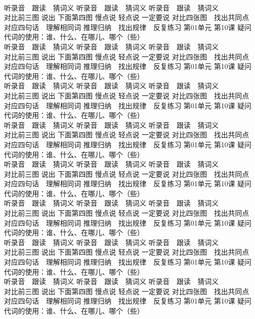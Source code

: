 \documentclass[8pt]{extreport}
\begin{document}
\begin{CJK}{UTF8}{min}
\\	听录音　跟读　猜词义 听录音　跟读　猜词义 听录音　跟读　猜词义 
\\	对比前三图 说出 下面第四图 慢点说 轻点说 一定要说	对比四张图　找出共同点 对应四句话　理解相同词 推理归纳　找出规律　反复练习 第01单元 第10课 疑问代词的使用：谁、什么、在哪儿、哪个（些）
\\	听录音　跟读　猜词义 听录音　跟读　猜词义 听录音　跟读　猜词义 
\\	对比前三图 说出 下面第四图 慢点说 轻点说 一定要说	对比四张图　找出共同点 对应四句话　理解相同词 推理归纳　找出规律　反复练习 第01单元 第10课 疑问代词的使用：谁、什么、在哪儿、哪个（些）
\\	听录音　跟读　猜词义 听录音　跟读　猜词义 听录音　跟读　猜词义 
\\	对比前三图 说出 下面第四图 慢点说 轻点说 一定要说	对比四张图　找出共同点 对应四句话　理解相同词 推理归纳　找出规律　反复练习 第01单元 第10课 疑问代词的使用：谁、什么、在哪儿、哪个（些）
\\	听录音　跟读　猜词义 听录音　跟读　猜词义 听录音　跟读　猜词义 
\\	对比前三图 说出 下面第四图 慢点说 轻点说 一定要说	对比四张图　找出共同点 对应四句话　理解相同词 推理归纳　找出规律　反复练习 第01单元 第10课 疑问代词的使用：谁、什么、在哪儿、哪个（些）
\\	听录音　跟读　猜词义 听录音　跟读　猜词义 听录音　跟读　猜词义 
\\	对比前三图 说出 下面第四图 慢点说 轻点说 一定要说	对比四张图　找出共同点 对应四句话　理解相同词 推理归纳　找出规律　反复练习 第01单元 第10课 疑问代词的使用：谁、什么、在哪儿、哪个（些）
\\	听录音　跟读　猜词义 听录音　跟读　猜词义 听录音　跟读　猜词义 
\\	对比前三图 说出 下面第四图 慢点说 轻点说 一定要说	对比四张图　找出共同点 对应四句话　理解相同词 推理归纳　找出规律　反复练习 第01单元 第10课 疑问代词的使用：谁、什么、在哪儿、哪个（些）
\\	听录音　跟读　猜词义 听录音　跟读　猜词义 听录音　跟读　猜词义 
\\	对比前三图 说出 下面第四图 慢点说 轻点说 一定要说	对比四张图　找出共同点 对应四句话　理解相同词 推理归纳　找出规律　反复练习 第01单元 第10课 疑问代词的使用：谁、什么、在哪儿、哪个（些）
\\	听录音　跟读　猜词义 听录音　跟读　猜词义 听录音　跟读　猜词义 
\\	对比前三图 说出 下面第四图 慢点说 轻点说 一定要说	对比四张图　找出共同点 对应四句话　理解相同词 推理归纳　找出规律　反复练习 第01单元 第10课 疑问代词的使用：谁、什么、在哪儿、哪个（些）

\end{CJK}
\end{document}

